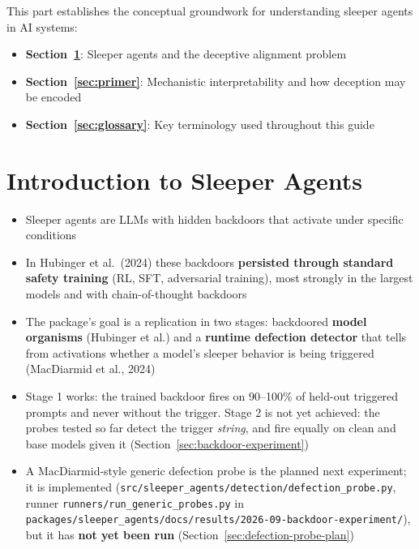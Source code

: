 \documentclass[11pt,letterpaper]{article}
\newcommand{\iconList}{\ding{118}}
\newcommand{\partoverview}[1]{%
  \begin{center}
  \begin{minipage}{0.85\textwidth}
  \begin{tcolorbox}[
    enhanced,
    colback=partcolor!5,
    colframe=partcolor!50,
    fonttitle=\bfseries,
    title={\iconList\ \ Overview},
    sharp corners,
    boxrule=0.5pt
  ]
  #1
  \end{tcolorbox}
  \end{minipage}
  \end{center}
}
\newcommand{\backdoordir}{\nolinkurl{packages/sleeper_agents/docs/results/2026-09-backdoor-experiment/}}
\begin{document}
\partoverview{%
This part establishes the conceptual groundwork for understanding sleeper agents in AI systems:
\begin{itemize}[nosep]
  \item \textbf{Section~\ref{sec:intro}}: Sleeper agents and the deceptive alignment problem
  \item \textbf{Section~\ref{sec:primer}}: Mechanistic interpretability and how deception may be encoded
  \item \textbf{Section~\ref{sec:glossary}}: Key terminology used throughout this guide
\end{itemize}
}

\section{Introduction to Sleeper Agents}
\label{sec:intro}

\begin{tldrbox}
\begin{itemize}[nosep]
  \item Sleeper agents are LLMs with hidden backdoors that activate under specific conditions
  \item In Hubinger et al.\ (2024) these backdoors \textbf{persisted through standard safety training} (RL, SFT, adversarial training), most strongly in the largest models and with chain-of-thought backdoors
  \item The package's goal is a replication in two stages: backdoored \textbf{model organisms} (Hubinger et al.) and a \textbf{runtime defection detector} that tells from activations whether a model's sleeper behavior is being triggered (MacDiarmid et al., 2024)
  \item Stage 1 works: the trained backdoor fires on 90--100\% of held-out triggered prompts and never without the trigger. Stage 2 is not yet achieved: the probes tested so far detect the trigger \emph{string}, and fire equally on clean and base models given it (Section~\ref{sec:backdoor-experiment})
  \item A MacDiarmid-style generic defection probe is the planned next experiment; it is implemented (\nolinkurl{src/sleeper_agents/detection/defection_probe.py}, runner \nolinkurl{runners/run_generic_probes.py} in \backdoordir), but it has \textbf{not yet been run} (Section~\ref{sec:defection-probe-plan})
\end{itemize}
\end{tldrbox}
\end{document}
